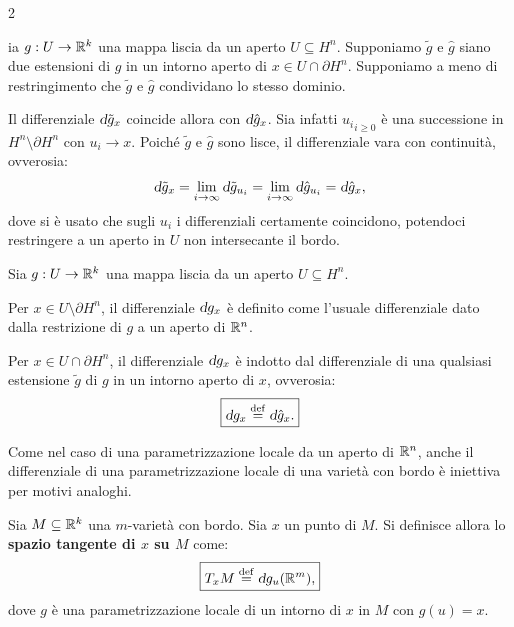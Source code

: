 \begin{multicols*}{2}
    \begin{remark}
        ia $g : U \to \mathbb{R}^k$ una mappa liscia da un aperto $U \subseteq H^n$.
        Supponiamo $\tilde{g}$ e $\hat{g}$ siano due estensioni di $g$ in
        un intorno aperto di $x \in U \cap \partial H^n$. Supponiamo a meno di restringimento
        che $\tilde{g}$ e $\hat{g}$ condividano lo stesso dominio. \smallskip

        Il differenziale $\dif \tilde{g}_x$ coincide allora con
        $\dif \hat{g}_x$. Sia infatti ${u_i}_{i \geq 0}$ è una successione
        in $H^n \setminus \partial H^n$ con $u_i \to x$. Poiché $\tilde{g}$
        e $\hat{g}$ sono lisce, il differenziale vara con continuità, ovverosia:
        \[
            \dif \tilde{g}_x = \lim_{i \to \infty} \dif \tilde{g}_{u_i} =
            \lim_{i \to \infty} \dif \hat{g}_{u_i} = \dif \hat{g}_x,
        \]
        dove si è usato che sugli $u_i$ i differenziali certamente coincidono,
        potendoci restringere a un aperto in $U$ non intersecante il bordo.
    \end{remark}

    \begin{definition}[Differenziale su $H^n$]
        Sia $g : U \to \mathbb{R}^k$ una mappa liscia da un aperto $U \subseteq H^n$. \smallskip

        Per $x \in U \setminus \partial H^n$, il differenziale $\dif g_x$ è
        definito come l'usuale differenziale dato dalla restrizione di $g$ a un aperto
        di $\mathbb{R}^n$. \smallskip

        Per $x \in U \cap \partial H^n$, il differenziale $\dif g_x$ è indotto dal
        differenziale di una qualsiasi estensione $\tilde{g}$ di $g$ in un intorno
        aperto di $x$, ovverosia:
        \[
            \boxed{\dif g_x \defeq \dif \hat{g}_x.}
        \]
    \end{definition}

    \begin{remark}
        Come nel caso di una parametrizzazione locale da un aperto di $\mathbb{R}^n$,
        anche il differenziale di una parametrizzazione locale di una varietà con
        bordo è iniettiva per motivi analoghi.
    \end{remark}

    \begin{definition}
        Sia $M \subseteq \mathbb{R}^k$ una $m$-varietà con bordo. Sia
        $x$ un punto di $M$. Si definisce allora lo \textbf{spazio tangente
            di $x$ su $M$} come:
        \[
            \boxed{T_x M \defeq \dif g_u(\RR^m),}
        \]
        dove $g$ è una parametrizzazione locale di un intorno di $x$ in $M$
        con $g(u) = x$.
    \end{definition}


\end{multicols*}
